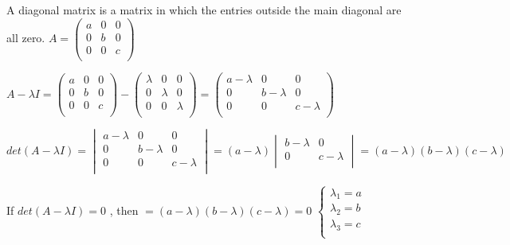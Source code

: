 \documentclass[fleqn]{article}
\begin{document}
\begin{enumerate}
      \textcolor{hwColor}{
        A diagonal matrix is a matrix in which the entries outside the main diagonal are all zero.
        $
        A=\begin{pmatrix}
          a & 0 & 0 \\
          0 & b & 0 \\
          0 & 0 & c \\
        \end{pmatrix}
        $
      }

      \textcolor{hwColor}{
        $
        A-\lambda I=\begin{pmatrix}
          a & 0 & 0 \\
          0 & b & 0 \\
          0 & 0 & c \\
        \end{pmatrix}-\begin{pmatrix}
          \lambda & 0 & 0 \\
          0 & \lambda & 0 \\
          0 & 0 & \lambda \\
        \end{pmatrix}=\begin{pmatrix}
          a-\lambda & 0 & 0 \\
          0 & b-\lambda & 0 \\
          0 & 0 & c-\lambda \\
        \end{pmatrix}
        $
      }

      \textcolor{hwColor}{
        $
        det(A-\lambda I)=\begin{vmatrix}
          a-\lambda & 0 & 0 \\
          0 & b-\lambda & 0 \\
          0 & 0 & c-\lambda \\
        \end{vmatrix}=(a-\lambda)\begin{vmatrix}
          b-\lambda & 0 \\
          0 & c-\lambda \\
        \end{vmatrix}=(a-\lambda)(b-\lambda)(c-\lambda)
        $
      }

      \textcolor{hwColor}{
        If $det(A-\lambda I)=0$
        , then $=(a-\lambda)(b-\lambda)(c-\lambda)=0$
        $
        \begin{cases}
          \lambda_1=a \\
          \lambda_2=b \\
          \lambda_3=c \\
        \end{cases}
        $
      }


\end{enumerate}
\end{document}

